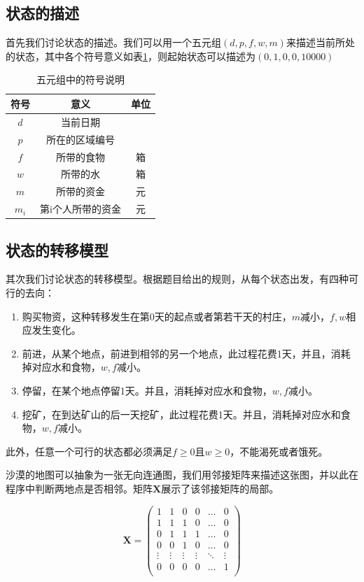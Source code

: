 \documentclass[withoutpreface,bwprint]{cumcmthesis} %
\begin{document}
\subsection{状态的描述}
首先我们讨论状态的描述。我们可以用一个五元组\((d,p,f,w,m)\)来描述当前所处的状态，其中各个符号意义如表\ref{zt}，则起始状态可以描述为\((0,1,0,0,10000)\)
\begin{table}[!htbp]
    \caption{五元组中的符号说明}\label{tab:001} \centering
    \begin{tabular}{ccc}
        \toprule[1.5pt]
        符号 & 意义 & 单位\\
        \midrule[1pt]
        $d$ & 当前日期 & \\
        $p$ & 所在的区域编号 & \\
        $f$ & 所带的食物 & 箱\\
        $w$ & 所带的水 & 箱\\
        $m$ & 所带的资金 & 元\\
        $m_i$ & 第i个人所带的资金 & 元\\
        \bottomrule[1.5pt]
    \end{tabular}
    \label{zt}
\end{table}

\subsection{状态的转移模型}
其次我们讨论状态的转移模型。根据题目给出的规则，从每个状态出发，有四种可行的去向：
\begin{enumerate}
    \item 购买物资，这种转移发生在第0天的起点或者第若干天的村庄，\(m\)减小，\(f,w\)相应发生变化。
    \item 前进，从某个地点，前进到相邻的另一个地点，此过程花费1天，并且，消耗掉对应水和食物，\(w,f\)减小。
    \item 停留，在某个地点停留1天。并且，消耗掉对应水和食物，\(w,f\)减小。
    \item 挖矿，在到达矿山的后一天挖矿，此过程花费1天。并且，消耗掉对应水和食物，\(w,f\)减小。
\end{enumerate}

此外，任意一个可行的状态都必须满足\(f\geq 0\)且\(w\geq 0\)，不能渴死或者饿死。

沙漠的地图可以抽象为一张无向连通图，我们用邻接矩阵来描述这张图，并以此在程序中判断两地点是否相邻。矩阵\(\mathbf{X}\)展示了该邻接矩阵的局部。

\[
\mathbf{X} = \left(
    \begin{array}{cccccc}
    1 & 1 & 0 & 0 & \ldots & 0\\
    1 & 1 & 1 & 0 & \ldots & 0\\
    0 & 1 & 1 & 1 & \ldots & 0\\
    0 & 0 & 1 & 0 & \ldots & 0\\
    \vdots & \vdots & \vdots & \vdots & \ddots & \vdots\\
    0 & 0 & 0 & 0 & \ldots & 1\\
    \end{array} \right)
\]
\end{document}
